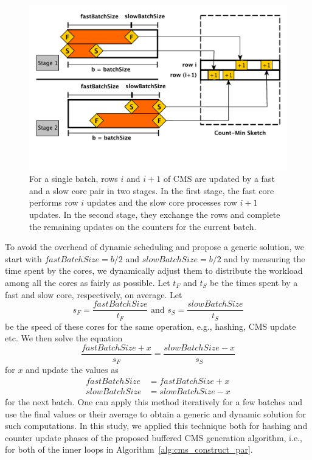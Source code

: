 \documentclass[10pt, review=true,sigconf]{acmart}
\begin{document}
\begin{figure}[htbp]
\begin{center}
\includegraphics[width=1.03\linewidth]{expfigs/fastslow.pdf}
\caption{For a single batch, rows $i$ and $i+1$ of CMS are updated by a fast and a slow core pair in two stages. In the first stage, the fast core performs row $i$ updates and the slow core processes row $i+1$ updates. In the second stage, they exchange the rows and complete the remaining updates on the counters for the current batch.}
\label{fig:fastslow}
\end{center}
\end{figure}

To avoid the overhead of dynamic scheduling and propose a generic solution, we start with $fastBatchSize = b/2$ and $slowBatchSize = b/2$ and by measuring the time spent by the cores, we dynamically adjust them to distribute the workload among all the cores as fairly as possible. Let $t_F$ and $t_S$ be the times spent by a fast and slow core, respectively, on average. Let $$s_F = \frac{fastBatchSize}{t_F} {\mbox{ \ \ \ \ and \ \ \ }} s_S = \frac{slowBatchSize}{t_S}$$ be the speed of these cores for the same operation, e.g., hashing, CMS update etc. We then solve the equation $$\frac{fastBatchSize + x}{s_F} = \frac{slowBatchSize - x}{s_S}$$ for $x$ and update the values as 
\begin{align*}
fastBatchSize &= fastBatchSize + x\\
slowBatchSize &= slowBatchSize - x
\end{align*}
for the next batch. One can apply this method iteratively for a few batches and use the final values or their average to obtain a generic and dynamic solution for such computations. In this study, we applied this technique both for hashing and counter update phases of the proposed buffered CMS generation algorithm, i.e., for both of the inner loops in Algorithm~\ref{alg:cms_construct_par}. 
\end{document}
